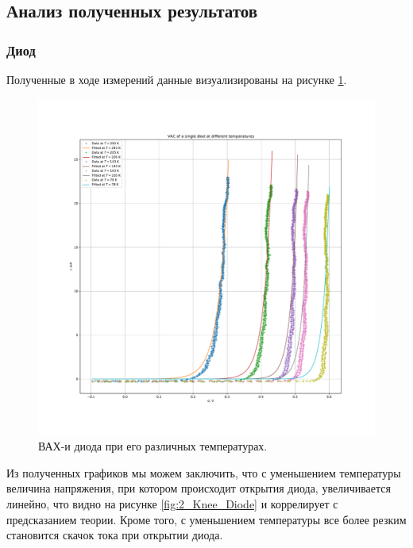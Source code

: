 \documentclass[a4paper, 12pt]{article}
\begin{document}
\subsection{Анализ полученных результатов}

\subsubsection{Диод}

Полученные в ходе измерений данные визуализированы на рисунке \ref{fig:2_Diode}.

\begin{figure}[H]
	\centering
	\includegraphics[width=\linewidth]{2_Diode}
	\caption{ВАХ-и диода при его различных температурах.}
	\label{fig:2_Diode}
\end{figure}

Из полученных графиков мы можем заключить, что с уменьшением температуры величина напряжения, при котором происходит открытия диода, увеличивается линейно, что видно на рисунке \ref{fig:2_Knee_Diode} и коррелирует с предсказанием теории. Кроме того, с уменьшением температуры все более резким становится скачок тока при открытии диода.
\end{document}
